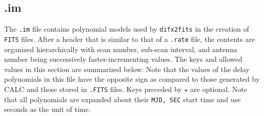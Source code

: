 %
%








\subsection{.im} \label{sec:im}

The {\tt .im} file contains polynomial models used by {\tt difx2fits} in the creation of {\tt FITS} files.
After a header that is similar to that of a {\tt .rate} file, the contents are organized hierarchically with scan number, sub-scan interval, and antenna number being successively faster-incrementing values.
The keys and allowed values in this section are summarized below:
Note that the values of the delay polynomials in this file have the opposite sign as compared to those generated by CALC and those stored in {\tt .FITS} files.
Keys preceded by $\star$ are optional.
Note that all polynomials are expanded about their {\tt MJD, SEC} start time and use seconds as the unit of time.

